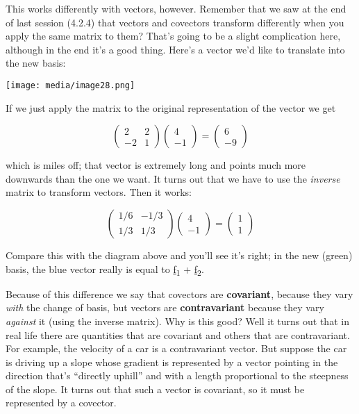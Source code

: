 \documentclass[oneside,english]{amsbook}
\numberwithin{section}{chapter}
\theoremstyle{plain}
\theoremstyle{definition}
\begin{document}
This works differently with vectors, however. Remember that we saw at
the end of last session (4.2.4) that vectors and covectors transform
differently when you apply the same matrix to them? That's going to be a
slight complication here, although in the end it's a good thing. Here's
a vector we'd like to translate into the new basis:

\texttt{[image: media/image28.png]}

If we just apply the matrix to the original representation of the vector
we get

\[\begin{pmatrix}
	2 & 2 \\
	- 2 & 1
\end{pmatrix}\begin{pmatrix}
	4 \\
	- 1
\end{pmatrix} = \begin{pmatrix}
	6 \\
	- 9
\end{pmatrix}\]

which is miles off; that vector is extremely long and points much more
downwards than the one we want. It turns out that we have to use the
\emph{inverse} matrix to transform vectors. Then it works:

\[\begin{pmatrix}
	1/6 & - 1/3 \\
	1/3 & 1/3
\end{pmatrix}\begin{pmatrix}
	4 \\
	- 1
\end{pmatrix} = \begin{pmatrix}
	1 \\
	1
\end{pmatrix}\]

Compare this with the diagram above and you'll see it's right; in the
new (green) basis, the blue vector really is equal to
\ul{f}\textsubscript{1} + \ul{f}\textsubscript{2}.

Because of this difference we say that covectors are \textbf{covariant},
because they vary \emph{with} the change of basis, but vectors are
\textbf{contravariant} because they vary \emph{against} it (using the
inverse matrix). Why is this good? Well it turns out that in real life
there are quantities that are covariant and others that are
contravariant. For example, the velocity of a car is a contravariant
vector. But suppose the car is driving up a slope whose gradient is
represented by a vector pointing in the direction that's ``directly
uphill'' and with a length proportional to the steepness of the slope.
It turns out that such a vector is covariant, so it must be represented
by a covector.
\end{document}
